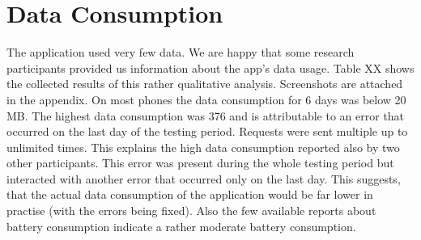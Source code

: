 \section{Data Consumption}
The application used very few data. We are happy that some research participants provided us information about the app's data usage. Table XX shows the collected results of this rather qualitative analysis. Screenshots are attached in the appendix. On most phones the data consumption for 6 days was below 20 MB. The highest data consumption was 376 and is attributable to an error that occurred on the last day of the testing period. Requests were sent multiple up to unlimited times. This explains the high data consumption reported also by two other participants. This error was present during the whole testing period but interacted with another error that occurred only on the last day. This suggests, that the actual data consumption of the application would be far lower in practise (with the errors being fixed).
Also the few available reports about battery consumption indicate a rather moderate battery consumption.

